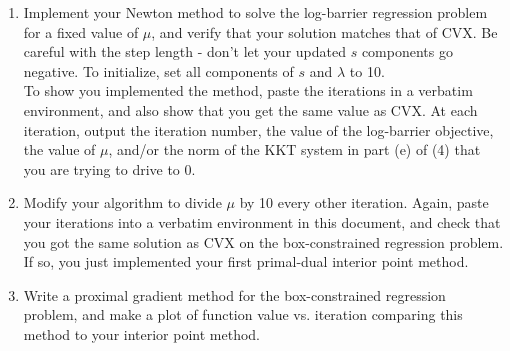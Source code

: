 \documentclass[12pt]{amsart}
\begin{document}
\begin{enumerate}
\begin{enumerate}
\item Implement your Newton method to solve the log-barrier regression problem for a fixed value of $\mu$, and verify that your 
solution matches that of CVX. Be careful with the step length - don't let your updated $s$ components go negative. 
To initialize, set all components of $s$ and $\lambda$ to 10. \\

To show you implemented the method, paste the iterations in a verbatim environment, and also show that you get the same value 
as CVX. At each iteration, output the iteration number, the value of the log-barrier objective, the value of $\mu$, 
and/or the norm of the KKT system in part (e) of (4) that you are trying to drive to 0.
\\

\item Modify your algorithm to divide $\mu$ by 10 every other iteration. Again, paste your iterations 
into a verbatim environment in this document, and check that you got the same solution as CVX 
on the box-constrained regression problem. If so, you just implemented your first primal-dual interior point method. 
\\

\item Write a proximal gradient method for the box-constrained regression problem, and make a plot of function value 
vs. iteration comparing this method to your interior point method. 


\end{enumerate}





\end{enumerate}
\end{document}

